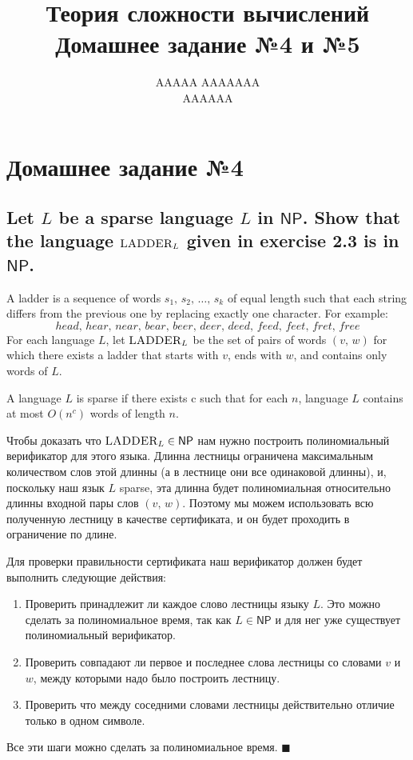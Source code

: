 \documentclass{article}
\title{Теория сложности вычислений \\ Домашнее задание №4 и №5}
\author{AAAAA AAAAAAA \\ AAAAAA}
\newcommand{\NP}{\ensuremath{\mathsf{NP}}}
\begin{document}
  \maketitle

  \setcounter{section}{3}
  \section{Домашнее задание №4}
  \setcounter{subsection}{10}
  \subsection{Let $L$ be a sparse language $L$ in \NP. Show that the language $\textsc{LADDER}_L$ given in exercise 2.3 is in \NP.}
  \begin{centerframebox}
    A ladder is a sequence of words $s_1,\, s_2,\, \dots,\, s_k$ of equal length such that each string differs from the previous one by replacing exactly one character.
    For example: $$head,\, hear,\, near,\, bear,\, beer,\, deer,\, deed,\, feed,\, feet,\, fret,\, free$$
    For each language $L$, let $\textsc{LADDER}_L$ be the set of pairs of words $(v,\, w)$ for which there exists a ladder that starts with $v$, ends with $w$, and contains only words of $L$. \vspace{5mm}

    A language $L$ is sparse if there exists c such that for each $n$, language $L$ contains at most $O(n^c)$ words of length $n$.
  \end{centerframebox}
  Чтобы доказать что $\textsc{LADDER}_L \in \NP$ нам нужно построить полиномиальный верификатор для этого языка.
  Длинна лестницы ограничена максимальным количеством слов этой длинны (а в лестнице они все одинаковой длинны), и, поскольку наш язык $L$ sparse, эта длинна будет полиномиальная относительно длинны входной пары слов $(v,\, w)$.
  Поэтому мы можем использовать всю полученную лестницу в качестве сертификата, и он будет проходить в ограничение по длине.

  \noindent
  Для проверки правильности сертификата наш верификатор должен будет выполнить следующие действия:
  \begin{enumerate}
    \item Проверить принадлежит ли каждое слово лестницы языку $L$. Это можно сделать за полиномиальное время, так как $L \in \NP$ и для нег уже существует полиномиальный верификатор.
    \item Проверить совпадают ли первое и последнее слова лестницы со словами $v$ и $w$, между которыми надо было построить лестницу.
    \item Проверить что между соседними словами лестницы действительно отличие только в одном символе.
  \end{enumerate}
  Все эти шаги можно сделать за полиномиальное время.
  $\blacksquare$
\end{document}
